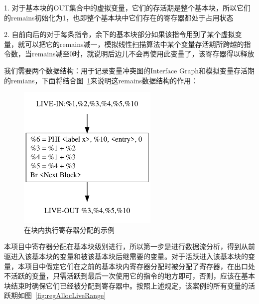 1. 对于基本块的OUT集合中的虚拟变量，它们的存活期是整个基本块，所以它们的remains初始化为1，也即整个基本块中它们存在的寄存器都处于占用状态

2. 自前向后的对于每条指令，余下的基本块部分如果该指令用到了某个虚拟变量，就可以把它的remains减一，模拟线性扫描算法中某个变量存活期所跨越的指令数，当remains减至0时，就说明后边儿不会再使用此变量了，该寄存器得以释放

我们需要两个数据结构：用于记录变量冲突图的Interface Graph和模拟变量存活期的remians，下面将结合图~\ref{fig:regAlloc}来说明这remains数据结构的作用：

\begin{figure}[htb]
  \centering
  \includegraphics[width=0.6\textwidth]{figures/reg_alloc.pdf}
  \caption{在块内执行寄存器分配的示例}
  \label{fig:regAlloc}
\end{figure}


本项目中寄存器分配在基本块级别进行，所以第一步是进行数据流分析，得到从前驱进入该基本块的变量和被该基本块后继需要的变量。对于活跃进入该基本块的变量，本项目中假定它们在之前的基本块内寄存器分配时被分配了寄存器，在出口处不活跃的变量，只需活跃到最后一次使用它的指令的地方即可，否则，应该在基本块结束时确保它们已经被分配到寄存器中。按照上述规定，该案例的所有变量的活跃期如图~\ref{fig:regAllocLiveRange}

